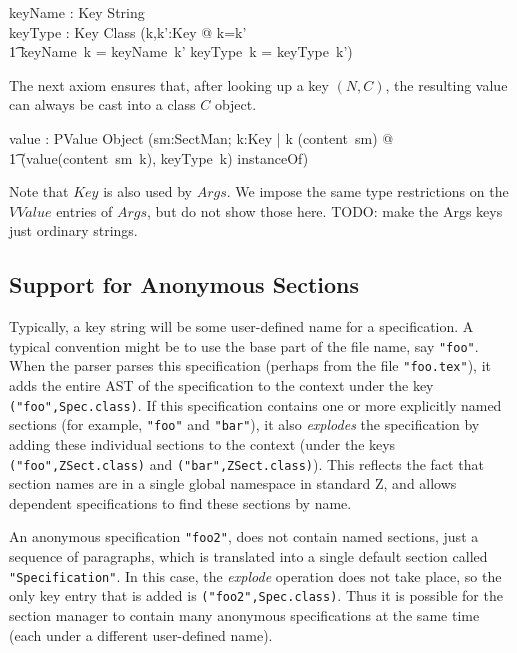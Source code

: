 \documentclass{llncs} %
\begin{document}
\begin{axdef}
  keyName : Key \fun String \\
  keyType : Key \fun Class
\where
  (\forall k,k':Key @ k=k' \\
  \t1   \iff keyName~k = keyName~k' \land keyType~k = keyType~k') \\
\end{axdef}

The next axiom ensures that, after looking up a key $(N,C)$,
the resulting value can always be cast into a class $C$ object.
\begin{axdef}
  value : PValue \fun Object  
\where
  (\forall sm:SectMan; k:Key | k \in \dom(content~sm) @ \\
  \t1 (value(content~sm~k), keyType~k) \in instanceOf)
\end{axdef}

Note that $Key$ is also used by $Args$.
We impose the same type restrictions on the $VValue$ entries
of $Args$, but do not show those here.
TODO: make the Args keys just ordinary strings.


\subsection{Support for Anonymous Sections}

Typically, a key string will be some user-defined name for
a specification.  A typical convention might be to use the 
base part of the file name, say \texttt{"foo"}.  
When the parser parses this specification (perhaps from the file
\texttt{"foo.tex"}), it adds the entire AST of the specification
to the context under the key \texttt{("foo",Spec.class)}.
If this specification contains one or more explicitly named sections
(for example, \texttt{"foo"} and \texttt{"bar"}),
it also \emph{explodes} the specification by adding these
individual sections to the context (under the keys
\texttt{("foo",ZSect.class)} and \texttt{("bar",ZSect.class)}).
This reflects the fact that section names are in a single global 
namespace in standard Z, and allows dependent specifications to
find these sections by name.

An anonymous specification \texttt{"foo2"}, does not contain named
sections, just a sequence of paragraphs, which is translated into
a single default section called \texttt{"Specification"}.
In this case, the \emph{explode} operation does not take place,
so the only key entry that is added is \texttt{("foo2",Spec.class)}.  
Thus it is possible for the section manager to contain many
anonymous specifications at the same time (each under a different
user-defined name).
\end{document}
